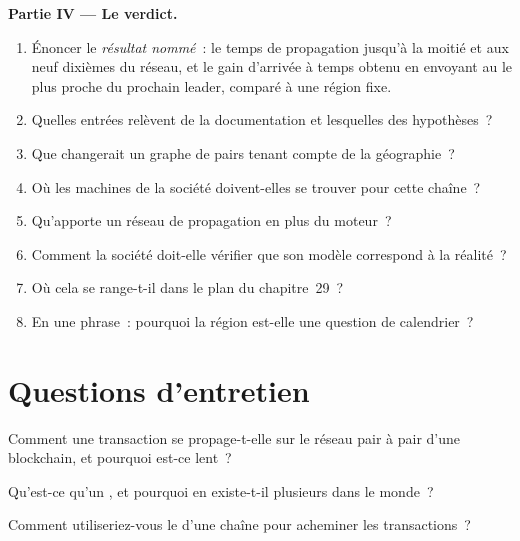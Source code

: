 \begin{problem}
\medskip\noindent\textbf{Partie IV --- Le verdict.}
\begin{enumerate}[resume]
\item Énoncer le \emph{résultat nommé}~: le temps de propagation jusqu'à la moitié et aux neuf dixièmes du réseau, et le gain d'arrivée à temps obtenu en envoyant au
   le plus proche du prochain leader, comparé à une région fixe.
\item Quelles entrées relèvent de la documentation et lesquelles des hypothèses~?
\item Que changerait un graphe de pairs tenant compte de la géographie~?
\item Où les machines de la société doivent-elles se trouver pour cette chaîne~?
\item Qu'apporte un réseau de propagation en plus du moteur~?
\item Comment la société doit-elle vérifier que son modèle correspond à la réalité~?
\item Où cela se range-t-il dans le plan du chapitre~29~?
\item En une phrase~: pourquoi la région est-elle une question de calendrier~?
\end{enumerate}
\end{problem}

\section{Questions d'entretien}

\begin{interviewq}\label{iq:nw:on-chain-connectivity:1}
Comment une transaction se propage-t-elle sur le réseau pair à pair d'une blockchain, et pourquoi est-ce lent~?
\end{interviewq}

\begin{interviewq}\label{iq:nw:on-chain-connectivity:2}
Qu'est-ce qu'un , et pourquoi en existe-t-il plusieurs dans le monde~?
\end{interviewq}

\begin{interviewq}\label{iq:nw:on-chain-connectivity:3}
Comment utiliseriez-vous le  d'une chaîne pour acheminer les transactions~?
\end{interviewq}

